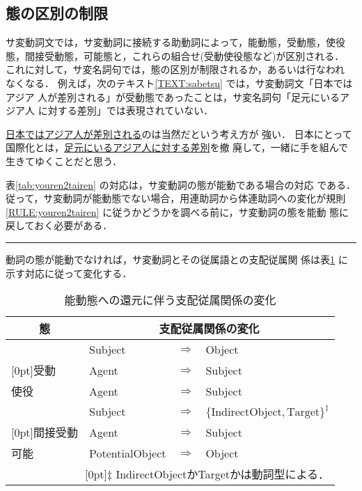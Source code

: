 \subsection{態の区別の制限}

サ変動詞文では，サ変動詞に接続する助動詞によって，能動態，受動態，使役
態，間接受動態，可能態と，これらの組合せ(受動使役態など)が区別される．
これに対して，サ変名詞句では，態の区別が制限されるか，あるいは行なわれ
なくなる．
例えば，次のテキスト\ref{TEXT:sabetsu} では，サ変動詞文「日本ではアジア
人が差別される」が受動態であったことは，サ変名詞句「足元にいるアジア人
に対する差別」では表現されていない．
\begin{TEXT}
\text \underline{日本ではアジア人が差別される}のは当然だという考え方が
強い．
日本にとって国際化とは，\underline{足元にいるアジア人に対する差別}を撤
廃して，一緒に手を組んで生きてゆくことだと思う．\label{TEXT:sabetsu}
\end{TEXT}

表\ref{tab:youren2tairen} の対応は，サ変動詞の態が能動である場合の対応
である．
従って，サ変動詞が能動態でない場合，用連助詞から体連助詞への変化が規則
\ref{RULE:youren2tairen} に従うかどうかを調べる前に，サ変動詞の態を能動
態に戻しておく必要がある．
\begin{RULE}
\rule サ変動詞の態が能動でなければ，サ変動詞とその従属語との支配従属関
係は表\ref{tab:voice} に示す対応に従って変化する．\label{RULE:voice}
\end{RULE}
\begin{table}[htbp]
\caption{能動態への還元に伴う支配従属関係の変化}
\label{tab:voice}
\begin{center}
\begin{tabular}{|l|lcl|} \hline
\multicolumn{1}{|c}{態}&\multicolumn{3}{|c|}{支配従属関係の変化}
\\\hline\hline
&Subject &$\Longrightarrow$ &Object     \\
\multicolumn{1}{|l|}{\raisebox{1.5ex}[0pt]{受動}}
&Agent &$\Longrightarrow$ &Subject      \\\hline
使役&Agent&$\Longrightarrow$ &Subject \\\hline
&Subject &$\Longrightarrow$ &
$\{\mbox{IndirectObject}, \mbox{Target}\}^\ddagger$ \\
\multicolumn{1}{|l|}{\raisebox{1.5ex}[0pt]{間接受動}}
&Agent &$\Longrightarrow$ &Subject      \\\hline
可能&PotentialObject &$\Longrightarrow$ &Object \\\hline
\multicolumn{4}{r}{\raisebox{0.5ex}[0pt]{\scriptsize $\ddagger$}
{\footnotesize IndirectObjectかTargetかは動詞型による．}}\\
\end{tabular}
\end{center}
\end{table}


